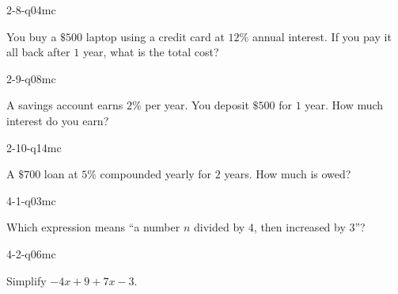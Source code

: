 \begin{practiceQuestion}{2-8-q04}{mc}
\begin{questionText}
You buy a $\$500$ laptop using a credit card at $12\%$ annual interest. If you pay it all back after $1$ year, what is the total cost?
\end{questionText}
\end{practiceQuestion}

\begin{practiceQuestion}{2-9-q08}{mc}
\begin{questionText}
A savings account earns $2\%$ per year. You deposit $\$500$ for $1$ year. How much interest do you earn?
\end{questionText}
\end{practiceQuestion}

\begin{practiceQuestion}{2-10-q14}{mc}
\begin{questionText}
A $\$700$ loan at $5\%$ compounded yearly for $2$ years. How much is owed?
\end{questionText}
\end{practiceQuestion}

\begin{practiceQuestion}{4-1-q03}{mc}
\begin{questionText}
Which expression means ``a number $n$ divided by $4$, then increased by $3$''?
\end{questionText}
\end{practiceQuestion}

\begin{practiceQuestion}{4-2-q06}{mc}
\begin{questionText}
Simplify $-4x + 9 + 7x - 3$.
\end{questionText}
\end{practiceQuestion}

